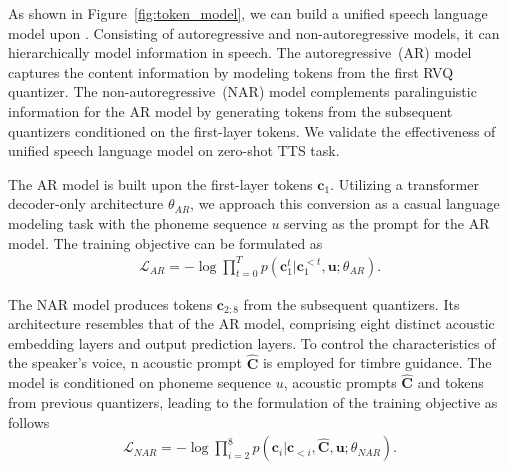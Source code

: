 

As shown in Figure~\ref{fig:token_model}, we can build a unified speech language model upon \method. Consisting of autoregressive and non-autoregressive models, it can hierarchically model information in speech. The autoregressive~(AR) model captures the content information by modeling tokens from the first RVQ quantizer. The non-autoregressive~(NAR) model complements paralinguistic information for the AR model by generating tokens from the subsequent quantizers conditioned on the first-layer tokens. 
We validate the effectiveness of unified speech language model on zero-shot TTS task. 

The AR model is built upon the first-layer tokens $\mathbf{c}_1$. Utilizing a transformer decoder-only architecture $\theta_{AR}$, we approach this conversion as a casual language modeling task with the phoneme sequence $u$ serving as the prompt for the AR model. The training objective can be formulated as
\begin{align*}
\mathcal{L}_{AR}=-\log\prod_{t=0}^{T}p(\mathbf{c}_1^t|\mathbf{c}_{1}^{<t},\mathbf{u};\theta_{AR}).
\end{align*}

The NAR model produces tokens $\mathbf{c}_{2:8}$ from the subsequent quantizers. Its architecture resembles that of the AR model, comprising eight distinct acoustic embedding layers and output prediction layers. To control the characteristics of the speaker’s voice, n acoustic prompt $\mathbf{\hat{C}}$ is employed for timbre guidance. The model is conditioned on phoneme sequence $u$, acoustic prompts $\mathbf{\hat{C}}$ and tokens from previous quantizers, leading to the formulation of the training objective as follows
\begin{align*}
\mathcal{L}_{NAR}=-\log\prod_{i=2}^{8}p(\mathbf{c}_{i}|\mathbf{c}_{<i},\mathbf{\hat{C}},\mathbf{u};\theta_{NAR}).
\end{align*}


